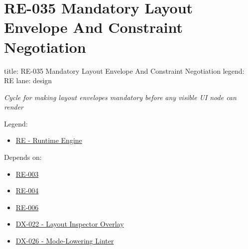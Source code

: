 \chapter{RE-035 Mandatory Layout Envelope And Constraint Negotiation}\label{record-163}

\smallskip

\begin{RecordMeta}
title: RE-035 Mandatory Layout Envelope And Constraint Negotiation
legend: RE
lane: design

\end{RecordMeta}

\emph{Cycle for making layout envelopes mandatory before any visible UI node can render}

Legend:

\begin{itemize}
\tightlist
\item
  \href{https://github.com/flyingrobots/bijou/blob/1853ad902f6bf219326409e7f743a5a1d6517dbc/docs/legends/RE-runtime-engine.md}{RE - Runtime Engine}
\end{itemize}

Depends on:

\begin{itemize}
\tightlist
\item
  \href{https://github.com/flyingrobots/bijou/blob/cbd70612140e7a450d764b3c7be1c6af878b99bc/docs/design/RE-003-retain-layout-trees-and-layout-invalidation.md}{RE-003}
\item
  \href{https://github.com/flyingrobots/bijou/blob/cbd70612140e7a450d764b3c7be1c6af878b99bc/docs/design/RE-004-route-input-through-layouts-and-layer-bubbling.md}{RE-004}
\item
  \href{https://github.com/flyingrobots/bijou/blob/cbd70612140e7a450d764b3c7be1c6af878b99bc/docs/design/RE-006-formalize-component-layout-and-interaction-contracts.md}{RE-006}
\item
  \href{https://github.com/flyingrobots/bijou/blob/cbd70612140e7a450d764b3c7be1c6af878b99bc/docs/design/DX-022-layout-inspector-overlay.md}{DX-022 - Layout Inspector Overlay}
\item
  \href{https://github.com/flyingrobots/bijou/blob/cbd70612140e7a450d764b3c7be1c6af878b99bc/docs/design/DX-026-mode-lowering-linter.md}{DX-026 - Mode-Lowering Linter}
\end{itemize}


